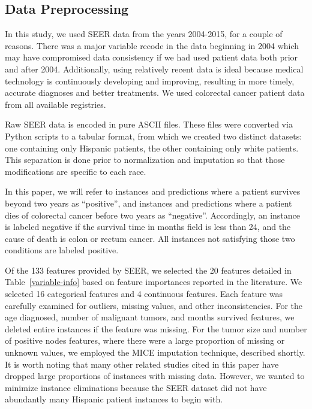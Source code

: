 \documentclass[review]{elsarticle}
\begin{document}
\subsection*{Data Preprocessing}
In this study, we used SEER data from the years 2004-2015, for a couple of reasons. There was a major variable recode in the data beginning in 2004 which may have compromised data consistency if we had used patient data both prior and after 2004. Additionally, using relatively recent data is ideal because medical technology is continuously developing and improving, resulting in more timely, accurate diagnoses and better treatments. We used colorectal cancer patient data from all available registries.

Raw SEER data is encoded in pure ASCII files. These files were converted via Python scripts to a tabular format, from which we created two distinct datasets: one containing only Hispanic patients, the other containing only white patients. This separation is done prior to normalization and imputation so that those modifications are specific to each race.

In this paper, we will refer to instances and predictions where a patient survives beyond two years as “positive”, and instances and predictions where a patient dies of colorectal cancer before two years as “negative”. Accordingly, an instance is labeled negative if the survival time in months field is less than 24, and the cause of death is colon or rectum cancer. All instances not satisfying those two conditions are labeled positive.

Of the 133 features provided by SEER, we selected the 20 features detailed in Table~\ref{variable-info} based on feature importances reported in the literature. We selected 16 categorical features and 4 continuous features. Each feature was carefully examined for outliers, missing values, and other inconsistencies. For the age diagnosed, number of malignant tumors, and months survived features, we deleted entire instances if the feature was missing. For the tumor size and number of positive nodes features,  where there were a large proportion of missing or unknown values, we employed the MICE imputation technique, described shortly. It is worth noting that many other related studies cited in this paper have dropped large proportions of instances with missing data. However, we wanted to minimize instance eliminations because the SEER dataset did not have abundantly many Hispanic patient instances to begin with.
\end{document}
